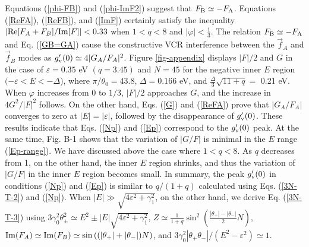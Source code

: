 \documentclass{jpsj3}
\begin{document}
Equations (\ref{phi-FB}) and (\ref{phi-ImF2})
suggest that $F_{\rm B} \simeq -F_{\rm A}$.
Equations (\ref{ReFA}), (\ref{ReFB}), and (\ref{ImF}) certainly satisfy the
inequality $\left|{\rm Re} [F_A+F_B]/{\rm Im} [F]\right| < 0.33$
when $1 < q < 8$ and $|\varphi| <\frac{1}{3}$.
The relation $F_{\rm B} \simeq -F_{\rm A}$
and Eq. (\ref{GB=GA})
cause the constructive VCR interference between the 
$\vec{f}_A$ and $\vec{f}_{B}$
modes as $g'_{\rm v}(0) \simeq 4|G_A/F_A|^2$.
Figure \ref{fig-appendix} displays 
$|F|/2$ and $G$ 
in the case of $\varepsilon= 0.35$ eV $(q=3.45)$ and $N=45$ 
for the negative inner $E$ region $( -\varepsilon < E < -\Delta$),  
where $\pi/\theta_0 = 43.8$, $\Delta=0.166$ eV, 
and $\frac{\Delta}{3}\sqrt{11+q} =$ 0.21 eV.
When $\varphi$ increases from 0 to $1/3$,
$|F|/2$ approaches $G$, and the increase in
$4G^2/|F|^2$ follows.
On the other hand, Eqs. (\ref{G}) and (\ref{ReFA}) prove that 
$|G_A/F_A|$ converges to zero at $|E|=|\varepsilon|$, followed
by the disappearance  of $g_{\rm v}'(0)$.
These results indicate that Eqs. (\ref{Np}) and (\ref{Ep})
correspond to the $g'_{\rm v}(0)$ peak.
At the same time, Fig. B-1 shows 
that the variation of $|G/F|$ is minimal in the $E$ range (\ref{Ep-range}).
We have discussed above the case where $1<q<8$.
As $q$ decreases from 1, on the other hand, the inner $E$ region shrinks, and
thus the variation of $|G/F|$ in the inner $E$ region becomes small.
In summary, the peak $g'_{\rm v}(0)$
in conditions (\ref{Np}) and (\ref{Ep}) 
is similar to $q/(1+q)$ calculated using Eqs. (\ref{3N-T-2})
and (\ref{Np}).
When $|E| \gg \sqrt{4\varepsilon^2+\gamma_1^2}$, on the other hand, we derive 
Eq. (\ref{3N-T-3}) using
$3\gamma_0^2\theta_\pm^2\simeq E^2\pm|E|\sqrt{4\varepsilon^2+\gamma_1^2}$, 
$Z \simeq \frac{1}{1+q}\sin^2\left(\frac{|\theta_+|-|\theta_-|}{2}N\right)$, 
${\rm Im}(F_A) \simeq {\rm Im}(F_B) 
\simeq \sin\left((|\theta_+|+|\theta_-|)N\right)$, and $3\gamma_0^2|\theta_+\theta_-|/(E^2-\varepsilon^2) \simeq 1$.
\end{document}
